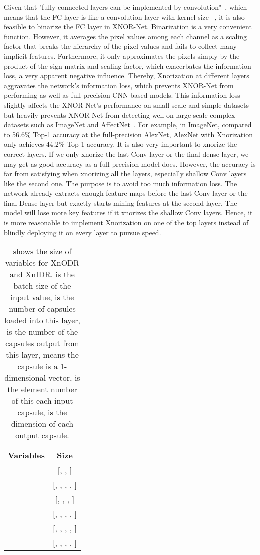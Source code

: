 \documentclass[sn-mathphys,iicol,Numbered]{sn-jnl}
\begin{document}
Given that "fully connected layers can be implemented by convolution"~\citep{A2_xnor}, which means that the FC layer is like a convolution layer with kernel size ~\citep{A2_xnor}, it is also feasible to binarize the FC layer in XNOR-Net. Binarization is a very convenient function. However, it averages the pixel values among each channel as a scaling factor that breaks the hierarchy of the pixel values and fails to collect many implicit features. Furthermore, it only approximates the pixels simply by the product of the sign matrix and scaling factor, which exacerbates the information loss, a very apparent negative influence. Thereby, Xnorization at different layers aggravates the network's information loss, which prevents XNOR-Net from performing as well as full-precision CNN-based models. This information loss slightly affects the XNOR-Net's performance on small-scale and simple datasets but heavily prevents XNOR-Net from detecting well on large-scale complex datasets such as ImageNet and AffectNet~\citep{A52_affnet}. For example, in ImageNet, compared to 56.6\% Top-1 accuracy at the full-precision AlexNet, AlexNet with Xnorization only achieves 44.2\% Top-1 accuracy. It is also very important to xnorize the correct layers. If we only xnorize the last Conv layer or the final dense layer, we may get as good accuracy as a full-precision model does. However, the accuracy is far from satisfying when xnorizing all the layers, especially shallow Conv layers like the second one. The purpose is to avoid too much information loss. The network already extracts enough feature maps before the last Conv layer or the final Dense layer but exactly starts mining features at the second layer. The model will lose more key features if it xnorizes the shallow Conv layers. Hence, it is more reasonable to implement Xnorization on one of the top layers instead of blindly deploying it on every layer to pursue speed.

\begin{table}[ht]\small
\centering
\caption{shows the size of variables for XnODR and XnIDR.  is the batch size of the input value,  is the number of capsules loaded into this layer,  is the number of the capsules output from this layer,  means the capsule is a 1-dimensional vector,  is the element number of this each input capsule,  is the dimension of each output capsule.}
\begin{tabular}{l|c} 
\hline
Variables & Size \\
\hline
\hline
 & [, , ] \\
 & [, , , , ]  \\
 & [, , , ] \\
 & [, , , , ] \\
       & [, , , , ] \\
       & [, , , , ] \\
\hline
\end{tabular}
\vspace{-0.3cm}
\label{tab:4}
\end{table}
\end{document}
